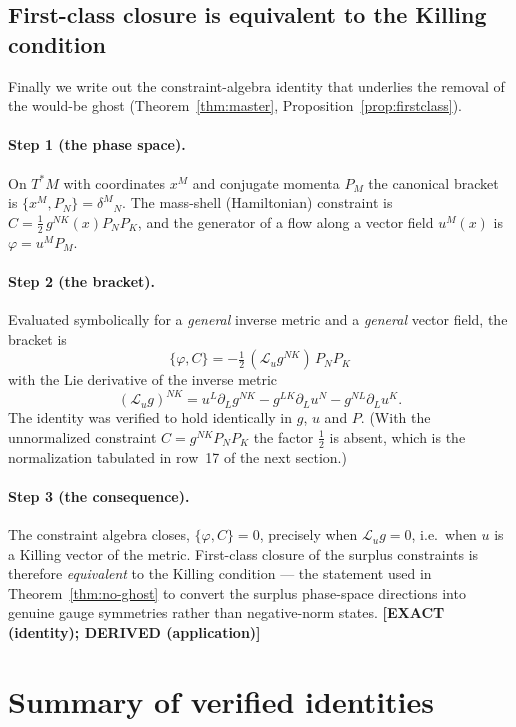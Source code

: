 \documentclass[11pt,oneside]{book}
\newcommand{\Lie}{\mathcal{L}}
\newcommand{\status}[1]{{\sffamily\bfseries\color{statuscol}[#1]}}
\theoremstyle{plain}
\theoremstyle{definition}
\theoremstyle{remark}
\begin{document}
\subsection{First-class closure is equivalent to the Killing condition}
\label{wd:killing}
Finally we write out the constraint-algebra identity that underlies the removal of the
would-be ghost (Theorem~\ref{thm:master}, Proposition~\ref{prop:firstclass}).

\paragraph{Step 1 (the phase space).}
On $T^*M$ with coordinates $x^M$ and conjugate momenta $P_M$ the canonical bracket is
$\{x^M,P_N\}=\delta^M{}_N$. The mass-shell (Hamiltonian) constraint is
$C=\tfrac12\,g^{NK}(x)P_NP_K$, and the generator of a flow along a vector field
$u^M(x)$ is $\varphi=u^MP_M$.

\paragraph{Step 2 (the bracket).}
Evaluated symbolically for a \emph{general} inverse metric and a \emph{general} vector
field, the bracket is
\[
  \boxed{\;\{\varphi,C\}=-\tfrac12\,(\Lie_u g^{NK})\,P_NP_K\;}
\]
with the Lie derivative of the inverse metric
\[
  (\Lie_u g)^{NK}=u^L\partial_L g^{NK}-g^{LK}\partial_L u^N-g^{NL}\partial_L u^K .
\]
The identity was verified to hold identically in $g$, $u$ and $P$. (With the
unnormalized constraint $C=g^{NK}P_NP_K$ the factor $\tfrac12$ is absent, which is the
normalization tabulated in row~17 of the next section.)

\paragraph{Step 3 (the consequence).}
The constraint algebra closes, $\{\varphi,C\}=0$, precisely when $\Lie_u g=0$, i.e.\
when $u$ is a Killing vector of the metric. First-class closure of the surplus
constraints is therefore \emph{equivalent} to the Killing condition --- the statement
used in Theorem~\ref{thm:no-ghost} to convert the surplus phase-space directions into
genuine gauge symmetries rather than negative-norm states. \status{EXACT (identity);
DERIVED (application)}

\section{Summary of verified identities}
\end{document}
